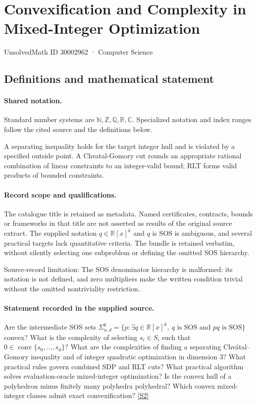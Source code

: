 \documentclass[11pt]{article}
\newcommand{\sref}[2]{\hyperlink{source:#1:#2}{[S#2]}}
\begin{document}
\setcounter{section}{30002961}
\section{Convexification and Complexity in Mixed-Integer Optimization}\label{30002962}
{\small\sffamily UnsolvedMath ID 30002962 · Computer Science}
\subsection{Definitions and mathematical statement}

\paragraph{Shared notation.}Standard number systems are $\mathbb N,\mathbb Z,\mathbb Q,\mathbb R,\mathbb C$. Specialized notation and index ranges follow the cited source and the definitions below.


A separating inequality holds for the target integer hull and is violated by a specified outside point. A Chvatal-Gomory cut rounds an appropriate rational combination of linear constraints to an integer-valid bound; RLT forms valid products of bounded constraints.
\paragraph{Record scope and qualifications.}
The catalogue title is retained as metadata. Named certificates, contracts, bounds or frameworks in that title are not asserted as results of the original source extract.
The supplied notation $q\in\mathbb R[x]^k$ and $q$ is SOS is ambiguous, and several practical targets lack quantitative criteria. The bundle is retained verbatim, without silently selecting one subproblem or defining the omitted SOS hierarchy.

Source-record limitation: The SOS denominator hierarchy is malformed: its notation is not defined, and zero multipliers make the written condition trivial without the omitted nontriviality restriction.
\paragraph{Statement recorded in the supplied source.}
Are the intermediate SOS sets $\Sigma^k_{n,d}=\{p:\exists q\in\mathbb{R}[x]^k,\ q\text{ is SOS and }pq\text{ is SOS}\}$ convex? What is the complexity of selecting $s_i\in S_i$ such that $0\in\operatorname{conv}\{s_0,\ldots,s_d\}$? What are the complexities of finding a separating Chvátal–Gomory inequality and of integer quadratic optimization in dimension $3$? What practical rules govern combined SDP and RLT cuts? What practical algorithm solves evaluation-oracle mixed-integer optimization? Is the convex hull of a polyhedron minus finitely many polyhedra polyhedral? Which convex mixed-integer classes admit exact convexification? \sref{30002962}{2}
\end{document}
